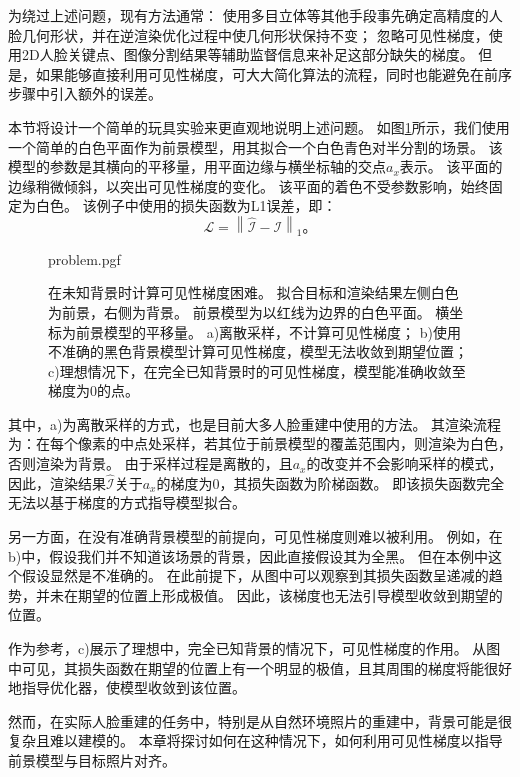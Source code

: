 为绕过上述问题，现有方法通常：
使用多目立体等其他手段事先确定高精度的人脸几何形状，并在逆渲染优化过程中使几何形状保持不变\citep{RiviereGBGB20}；
忽略可见性梯度，使用2D人脸关键点\citep{deep3d}、图像分割\citep{nvdiffrec}结果等辅助监督信息来补足这部分缺失的梯度。
但是，如果能够直接利用可见性梯度，可大大简化算法的流程，同时也能避免在前序步骤中引入额外的误差。

本节将设计一个简单的玩具实验来更直观地说明上述问题。
如图\ref{fig:problem}所示，我们使用一个简单的白色平面作为前景模型，用其拟合一个白色青色对半分割的场景。
该模型的参数是其横向的平移量，用平面边缘与横坐标轴的交点$a_x$表示。
该平面的边缘稍微倾斜，以突出可见性梯度的变化。
该平面的着色不受参数影响，始终固定为白色。
该例子中使用的损失函数为L1误差，即：
\begin{equation}
\mathcal{L} = \left\| \hat{\mathcal{I}} - \mathcal{I} \right\|_1
\text{。}
\end{equation}

\begin{figure}
\centering
{problem.pgf}
\caption[在未知背景时计算可见性梯度困难]{
    在未知背景时计算可见性梯度困难。
    拟合目标和渲染结果左侧白色为前景，右侧为背景。
    前景模型为以红线为边界的白色平面。
    横坐标为前景模型的平移量。
    a)离散采样，不计算可见性梯度；
    b)使用不准确的黑色背景模型计算可见性梯度，模型无法收敛到期望位置；
    c)理想情况下，在完全已知背景时的可见性梯度，模型能准确收敛至梯度为0的点。
}
\label{fig:problem}
\end{figure}

其中，a)为离散采样的方式，也是目前大多人脸重建中使用的方法。
其渲染流程为：在每个像素的中点处采样，若其位于前景模型的覆盖范围内，则渲染为白色，否则渲染为背景。
由于采样过程是离散的，且$a_x$的改变并不会影响采样的模式，因此，渲染结果$\hat{\mathcal{I}}$关于$a_x$的梯度为0，其损失函数为阶梯函数。
即该损失函数完全无法以基于梯度的方式指导模型拟合。

另一方面，在没有准确背景模型的前提向，可见性梯度则难以被利用。
例如，在b)中，假设我们并不知道该场景的背景，因此直接假设其为全黑。
但在本例中这个假设显然是不准确的。
在此前提下，从图中可以观察到其损失函数呈递减的趋势，并未在期望的位置上形成极值。
因此，该梯度也无法引导模型收敛到期望的位置。

作为参考，c)展示了理想中，完全已知背景的情况下，可见性梯度的作用。
从图中可见，其损失函数在期望的位置上有一个明显的极值，且其周围的梯度将能很好地指导优化器，使模型收敛到该位置。

然而，在实际人脸重建的任务中，特别是从自然环境照片的重建中，背景可能是很复杂且难以建模的。
本章将探讨如何在这种情况下，如何利用可见性梯度以指导前景模型与目标照片对齐。

